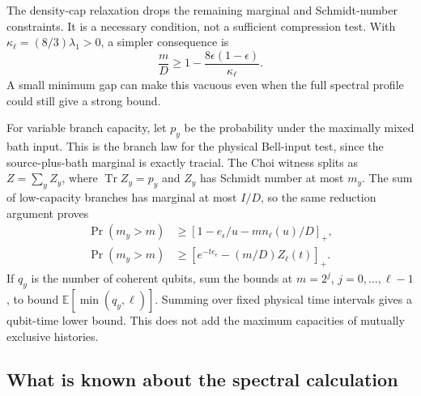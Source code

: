 \documentclass[11pt]{article}
\newcommand{\Tr}{\operatorname{Tr}}
\begin{document}
The density-cap relaxation drops the remaining marginal and Schmidt-number
constraints. It is a necessary condition, not a sufficient compression test.
With $\kappa_\ell=(8/3)\lambda_1>0$, a simpler consequence is
\[
 \frac mD\ge1-\frac{8\epsilon(1-\epsilon)}{\kappa_\ell}.
\]
A small minimum gap can make this vacuous even when the full spectral profile
could still give a strong bound.

For variable branch capacity, let $p_y$ be the probability under the maximally
mixed bath input. This is the branch law for the physical Bell-input test,
since the source-plus-bath marginal is exactly tracial. The Choi witness splits
as $Z=\sum_y Z_y$, where $\Tr Z_y=p_y$ and $Z_y$ has Schmidt number at most
$m_y$. The sum of low-capacity branches has marginal at most $I/D$, so the
same reduction argument proves
\begin{align}
 \Pr(m_y>m)&\ge[1-e_\epsilon/u-m n_\ell(u)/D]_+,\\
 \Pr(m_y>m)&\ge[e^{-t e_\epsilon}-(m/D)Z_\ell(t)]_+.
 \label{eq:tail}
\end{align}
If $q_y$ is the number of coherent qubits, sum the bounds at $m=2^j$,
$j=0,\ldots,\ell-1$, to bound $\mathbb E[\min(q_y,\ell)]$. Summing over
fixed physical time intervals gives a qubit-time lower bound. This does not
add the maximum capacities of mutually exclusive histories.

\subsection{What is known about the spectral calculation}
\end{document}
